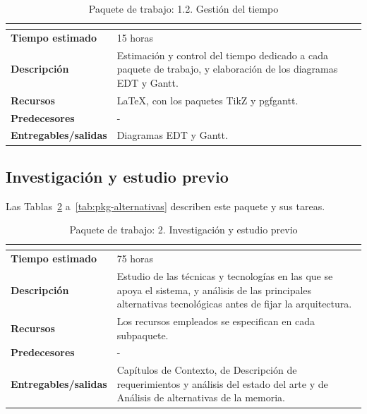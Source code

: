 \documentclass[11pt, a4paper]{report}
\begin{document}
	\begin{table}[H]
		\centering
		\begin{tabularx}{\linewidth}{|>{\bfseries}l|X|}
			\hline
			\rowcolor{pkg-gestion}
			\multicolumn{2}{|c|}{\textcolor{white}{\textbf{1.2. Gestión del tiempo}}} \\
			\hline
			Tiempo estimado & 15 horas \\
			\hline
			\rowcolor{fila-alterna}
			Descripción & Estimación y control del tiempo dedicado a cada paquete de trabajo, y elaboración de los diagramas EDT y Gantt. \\
			\hline
			Recursos & LaTeX, con los paquetes TikZ y pgfgantt. \\
			\hline
			\rowcolor{fila-alterna}
			Predecesores & - \\
			\hline
			Entregables/salidas & Diagramas EDT y Gantt. \\
			\hline
		\end{tabularx}
		\caption{Paquete de trabajo: 1.2. Gestión del tiempo}
		\label{tab:pkg-gestion-tiempo}
	\end{table}

	\subsection{Investigación y estudio previo}

	Las Tablas~\ref{tab:pkg-investigacion} a~\ref{tab:pkg-alternativas} describen este paquete y sus tareas.

	\begin{table}[H]
		\centering
		\begin{tabularx}{\linewidth}{|>{\bfseries}l|X|}
			\hline
			\rowcolor{pkg-investigacion}
			\multicolumn{2}{|c|}{\textcolor{white}{\textbf{2. Investigación y estudio previo}}} \\
			\hline
			Tiempo estimado & 75 horas \\
			\hline
			\rowcolor{fila-alterna}
			Descripción & Estudio de las técnicas y tecnologías en las que se apoya
			el sistema, y análisis de las principales alternativas tecnológicas
			antes de fijar la arquitectura. \\
			\hline
			Recursos & Los recursos empleados se especifican en cada subpaquete. \\
			\hline
			\rowcolor{fila-alterna}
			Predecesores & - \\
			\hline
			Entregables/salidas & Capítulos de Contexto, de Descripción de
			requerimientos y análisis del estado del arte y de Análisis de
			alternativas de la memoria. \\
			\hline
		\end{tabularx}
		\caption{Paquete de trabajo: 2. Investigación y estudio previo}
		\label{tab:pkg-investigacion}
	\end{table}
\end{document}

